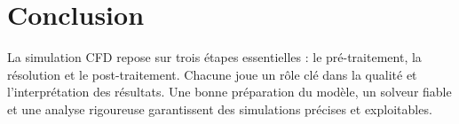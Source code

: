 \section{Conclusion}
\label{sec:conclusion_structure_cfd}

La simulation CFD repose sur trois étapes essentielles : le pré-traitement, la résolution et le post-traitement. Chacune joue un rôle clé dans la qualité et l'interprétation des résultats. Une bonne préparation du modèle, un solveur fiable et une analyse rigoureuse garantissent des simulations précises et exploitables.
